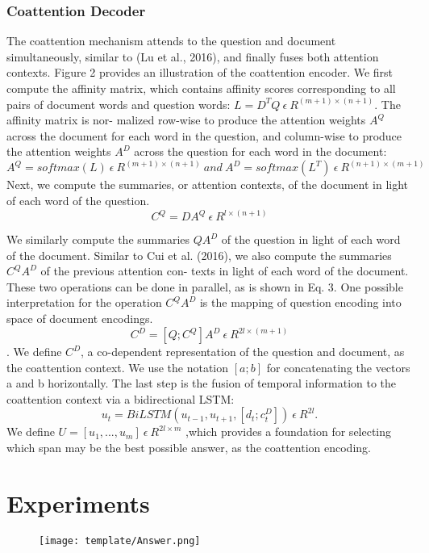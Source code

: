 \documentclass{article} %
\begin{document}
\subsubsection{Coattention Decoder}
The coattention mechanism  attends to the question and document simultaneously, similar to (Lu et al., 2016), and finally fuses both attention contexts. Figure 2 provides an illustration of the coattention encoder.
We first compute the affinity matrix, which contains affinity scores corresponding to all pairs of document words and question words: $ L = D^{T}Q \ \epsilon \  R^{(m+1)\times(n+1)} $. The affinity matrix is nor-
malized row-wise to produce the attention weights $A^{Q}$ across the document for each word in the question, and column-wise to produce the attention weights $A^{D}$ across the question for each word in the document:
$$A^{Q} = softmax (L) \  \epsilon \ R^{(m+1)\times(n+1)} \ and \  A^{D} = softmax(L^{T}) \ \epsilon \ R^{(n+1)\times(m+1)}  $$
Next, we compute the summaries, or attention contexts, of the document in light of each word of the question.
$$C^{Q} = DA^{Q} \  \epsilon \  R^{l\times(n+1)}$$


We similarly compute the summaries $QA^{D}$ of the question in light of each word of the document. Similar to Cui et al. (2016), we also compute the summaries $C^{Q}A^{D}$ of the previous attention con- texts in light of each word of the document. These two operations can be done in parallel, as is shown in Eq. 3. One possible interpretation for the operation $C^{Q}A^{D}$ is the mapping of question encoding into space of document encodings.
$$C^{D} = [Q;C^{Q}] A^{D} \ \epsilon \ R^{2l\times(m+1)}$$. We define $C^{D}$, a co-dependent representation of the question and document, as the coattention
context. We use the notation $[a; b]$ for concatenating the vectors a and b horizontally.
The last step is the fusion of temporal information to the coattention context via a bidirectional
LSTM: $$
u_{t} = BiLSTM ( u_{t−1}, u_{t+1},  [d_{t}; c^{D}_{t}])    \ \epsilon \  R^{2l}.$$ We define $U =[u_1,...,u_m]\ \epsilon \ R^{2l \times m} $ ,which provides a foundation for selecting which span may
be the best possible answer, as the coattention encoding.


\section{Experiments}
\begin{figure}
\texttt{[image: template/Answer.png]}
\centering
\end{figure}
\end{document}
